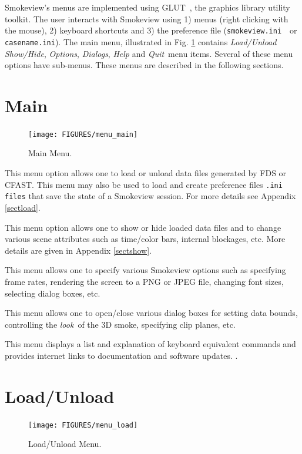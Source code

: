 \documentclass[11pt,twoside]{book}
\newcommand{\svini}{{\tt smokeview.ini}\ }
\newcommand{\parma}{.75}
\newcommand{\parmb}{.5}
\newcommand{\parmc}{0.25}
\newcommand{\blist}{
\begin{list}
{}{
\setlength{\leftmargin}{\parma in}
\setlength{\labelwidth}{\parmb in}
\setlength{\labelsep}{\parmc in}
\setlength{\listparindent}{0.3in}
\setlength{\topsep}{.3in}
\setlength{\parsep}{.0in}
}}
\newcommand{\elist}{\end{list}}
\newcommand{\hitem}[1]{\item[{\bf #1} \hfill]}
\begin{document}
Smokeview's menus are implemented using GLUT~\cite{OpenGLGlut},
the graphics library utility toolkit. The user interacts with
Smokeview using 1) menus (right clicking with the mouse), 2)
keyboard shortcuts and 3) the preference file (\svini\ or {\tt
casename.ini}).  The main menu, illustrated in Fig.
\ref{fig_mainmenu} contains {\em Load/Unload}\ \, {\em Show/Hide},
{\em Options}, {\em Dialogs}, {\em Help} and {\em Quit}\ menu
items. Several of these menu options have sub-menus. These menus
are described in the following sections.

\section{Main}

\begin{figure}[\figoptions]
\begin{center}
\texttt{[image: FIGURES/menu\_main]}
\caption{Main Menu.} \label{fig_mainmenu}
\end{center}
\end{figure}

\blist

\hitem{Load/Unload}This menu option allows one to load or unload
data files generated by FDS or CFAST.  This menu may also be used
to load and create preference files {\tt .ini files} that save the
state of a Smokeview session. For more details see Appendix
\ref{sectload}.
\\

\hitem{Show/Hide}This menu option allows one to show or hide
loaded data files and to change various scene attributes such as
time/color bars, internal blockages, etc.
More details are given in Appendix \ref{sectshow}.\\

\hitem{Options}This menu allows one to specify various
Smokeview options such as specifying frame rates, rendering
the screen to a PNG or JPEG file, changing font sizes,
selecting dialog boxes, etc.

\hitem{Dialogs}This menu allows one to open/close various dialog
boxes for setting data bounds, controlling the {\em look}\ of the 3D
smoke, specifying clip planes, etc.

\hitem{Help}This menu displays a list and explanation of keyboard
equivalent commands and provides internet links to documentation
and software updates.
. \\

\elist


\section{Load/Unload}
\begin{figure}[\figoptions]
\begin{center}
\texttt{[image: FIGURES/menu\_load]}
\caption{Load/Unload Menu.}
\label{fig_loadmenu}
\end{center}
\end{figure}
\end{document}
